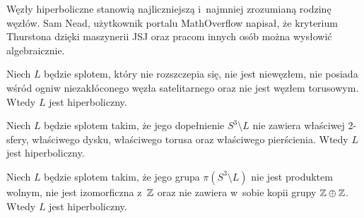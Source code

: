 Węzły hiperboliczne stanowią najliczniejszą i~najmniej zrozumianą rodzinę węzłów.
Sam Nead, użytkownik portalu MathOverflow napisał, że kryterium Thurstona dzięki maszynerii JSJ oraz pracom innych osób można wysłowić algebraicznie.

\begin{proposition}
    Niech $L$ będzie splotem, który nie rozszczepia się, nie jest niewęzłem, nie posiada wśród ogniw niezakłóconego węzła satelitarnego oraz nie jest węzłem torusowym.
    Wtedy $L$ jest hiperboliczny.
\end{proposition}

\begin{proposition}
    Niech $L$ będzie splotem takim, że jego dopełnienie $S^3 \setminus L$ nie zawiera właściwej 2-sfery, właściwego dysku, właściwego torusa oraz właściwego pierścienia.
    Wtedy $L$ jest hiperboliczny.
\end{proposition}

\begin{proposition}
    Niech $L$ będzie splotem takim, że jego grupa $\pi(S^3 \setminus L)$ nie jest produktem wolnym, nie jest izomorficzna z~$\mathbb Z$ oraz nie zawiera w~sobie kopii grupy $\mathbb Z \oplus \mathbb Z$.
    Wtedy $L$ jest hiperboliczny.
\end{proposition}

